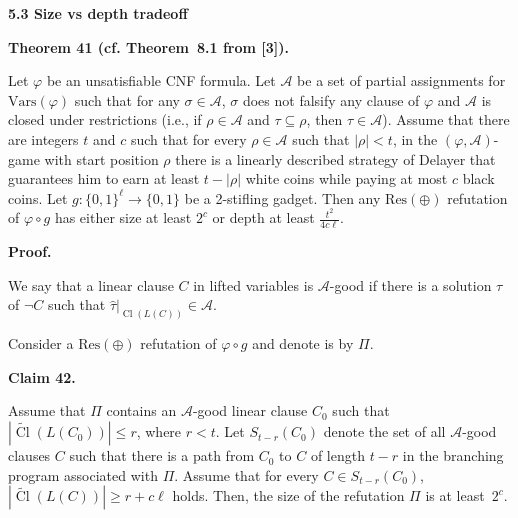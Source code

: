 \documentclass[10pt,a4paper]{article}
\begin{document}
\par\medskip\noindent\textbf{
5.3 Size vs depth tradeoff}\par


\par\medskip\noindent\textbf{
Theorem 41 (cf. Theorem 8.1 from [3]).
}\par



Let $\varphi$ be an unsatisfiable CNF formula. Let $\mathcal{A}$ be a set of partial assignments for $\mathrm{Vars}(\varphi)$ such that for any $\sigma\in\mathcal{A}$, $\sigma$ does not falsify any clause of $\varphi$ and $\mathcal{A}$ is closed under restrictions (i.e., if $\rho\in\mathcal{A}$ and $\tau\subseteq\rho$, then $\tau\in\mathcal{A}$). Assume that there are integers $t$ and $c$ such that for every $\rho\in\mathcal{A}$ such that $|\rho|<t$, in the $(\varphi,\mathcal{A})$-game with start position $\rho$ there is a linearly described strategy of Delayer that guarantees him to earn at least $t-|\rho|$ white coins while paying at most $c$ black coins.
Let $g\colon\{0,1\}^{\ell}\to\{0,1\}$ be a 2-stifling gadget. Then any $\mathrm{Res}(\oplus)$ refutation of $\varphi\circ g$ has either size at least $2^{c}$ or depth at least
$\frac{t^{2}}{4c\ell}$.\par



\par\medskip\noindent\textbf{Proof.}\par


We say that a linear clause $C$ in lifted variables is $\mathcal{A}$-good if there is a solution $\tau$ of $\lnot C$ such that $\hat{\tau}|_{\mathop{\mathrm{Cl}}(L(C))}\in\mathcal{A}$.\par



Consider a $\mathrm{Res}(\oplus)$ refutation of $\varphi\circ g$ and denote is by $\Pi$.\par



\par\medskip\noindent\textbf{
Claim 42. 
}\par



Assume that $\Pi$ contains an $\mathcal{A}$-good linear clause $C_{0}$ such that $|\widetilde{\mathop{\mathrm{Cl}}}(L(C_{0}))|\leq r$, where $r<t$. Let $S_{t-r}(C_{0})$ denote the set of all $\mathcal{A}$-good clauses $C$ such that there is a path from $C_{0}$ to $C$ of length $t-r$ in the branching program associated with $\Pi$.
Assume that for every $C\in S_{t-r}(C_{0})$, $|\widetilde{\mathop{\mathrm{Cl}}}(L(C))|\geq r+c\ell$ holds. Then, the size of the refutation $\Pi$ is at least $2^{c}$.\par
\end{document}
